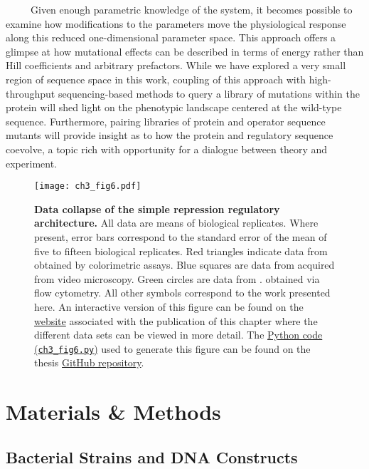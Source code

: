 \documentclass[12pt]{caltech_thesis}
\begin{document}
~~~~~Given enough parametric knowledge of the system, it becomes
possible to examine how modifications to the parameters move the
physiological response along this reduced one-dimensional parameter
space. This approach offers a glimpse at how mutational effects can be
described in terms of energy rather than Hill coefficients and arbitrary
prefactors. While we have explored a very small region of sequence space
in this work, coupling of this approach with high-throughput
sequencing-based methods to query a library of mutations within the
protein will shed light on the phenotypic landscape centered at the
wild-type sequence. Furthermore, pairing libraries of protein and
operator sequence mutants will provide insight as to how the protein and
regulatory sequence coevolve, a topic rich with opportunity for a
dialogue between theory and experiment.

\hypertarget{fig:all_data_collapse}{%
\begin{figure}
\centering
\texttt{[image: ch3\_fig6.pdf]}
\caption[{Data collapse of the simple repression regulatory
architecture. All data are means of biological
replicates.}]{\textbf{Data collapse of the simple repression regulatory
architecture.} All data are means of biological replicates. Where
present, error bars correspond to the standard error of the mean of five
to fifteen biological replicates. Red triangles indicate data from
\textcite{garcia2011} obtained by colorimetric assays. Blue squares are
data from \textcite{brewster2014} acquired from video microscopy. Green
circles are data from \textcite{razo-mejia2018}. obtained via flow
cytometry. All other symbols correspond to the work presented here. An
interactive version of this figure can be found on the
\href{https://www.rpgroup.caltech.edu/mwc_mutants}{website} associated
with the publication of this chapter where the different data sets can
be viewed in more detail. The
\href{https://github.com/gchure/phd/blob/master/src/chapter_03/code/ch3_fig6.py}{Python
code (\texttt{ch3\_fig6.py})} used to generate this figure can be found
on the thesis \href{https://github.com/gchure/phd}{GitHub repository}.}
\label{fig:all_data_collapse}
\end{figure}
}

\hypertarget{materials-methods-1}{%
\section{Materials \& Methods}\label{materials-methods-1}}

\hypertarget{bacterial-strains-and-dna-constructs-1}{%
\subsection{Bacterial Strains and DNA
Constructs}\label{bacterial-strains-and-dna-constructs-1}}
\end{document}

